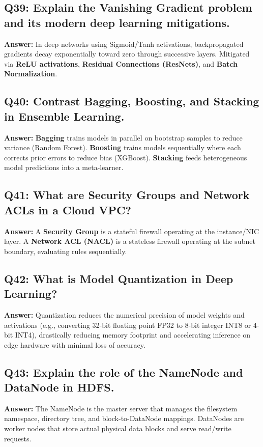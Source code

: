 \subsection*{Q39: Explain the Vanishing Gradient problem and its modern deep learning mitigations.}
\textbf{Answer:} In deep networks using Sigmoid/Tanh activations, backpropagated gradients decay exponentially toward zero through successive layers. Mitigated via \textbf{ReLU activations}, \textbf{Residual Connections (ResNets)}, and \textbf{Batch Normalization}.

\subsection*{Q40: Contrast Bagging, Boosting, and Stacking in Ensemble Learning.}
\textbf{Answer:} \textbf{Bagging} trains models in parallel on bootstrap samples to reduce variance (Random Forest). \textbf{Boosting} trains models sequentially where each corrects prior errors to reduce bias (XGBoost). \textbf{Stacking} feeds heterogeneous model predictions into a meta-learner.

\subsection*{Q41: What are Security Groups and Network ACLs in a Cloud VPC?}
\textbf{Answer:} A \textbf{Security Group} is a stateful firewall operating at the instance/NIC layer. A \textbf{Network ACL (NACL)} is a stateless firewall operating at the subnet boundary, evaluating rules sequentially.

\subsection*{Q42: What is Model Quantization in Deep Learning?}
\textbf{Answer:} Quantization reduces the numerical precision of model weights and activations (e.g., converting 32-bit floating point FP32 to 8-bit integer INT8 or 4-bit INT4), drastically reducing memory footprint and accelerating inference on edge hardware with minimal loss of accuracy.

\subsection*{Q43: Explain the role of the NameNode and DataNode in HDFS.}
\textbf{Answer:} The NameNode is the master server that manages the filesystem namespace, directory tree, and block-to-DataNode mappings. DataNodes are worker nodes that store actual physical data blocks and serve read/write requests.


